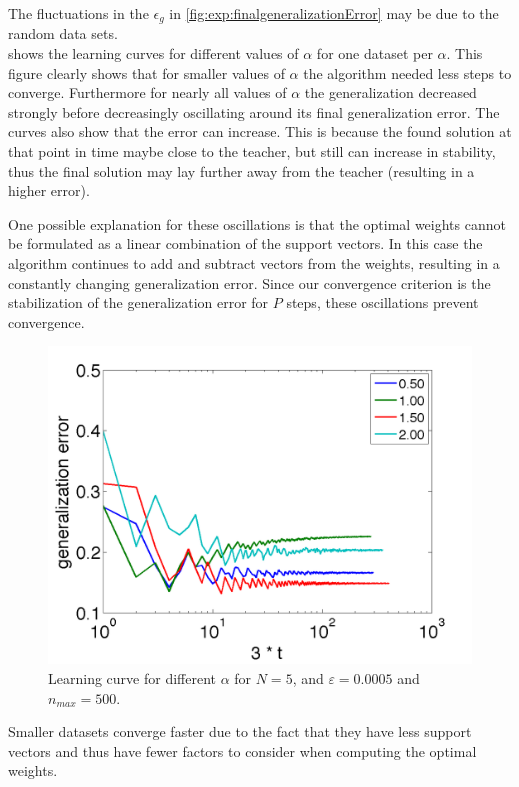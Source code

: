 The fluctuations in the $\epsilon_g$ in \cref{fig:exp:finalgeneralizationError} may be due to the random data sets.\\

 shows the learning curves for different values of $\alpha$ for one dataset per $\alpha$. This figure clearly shows that for smaller values of $\alpha$ the algorithm needed less steps to converge. Furthermore for nearly all values of $\alpha$ the generalization decreased strongly before decreasingly oscillating around its final generalization error. The curves also show that the error can increase. This is because the found solution at that point in time maybe close to the teacher, but still can increase in stability, thus the final solution may lay further away from the teacher (resulting in a higher error). 

One possible explanation for these oscillations is that the optimal weights cannot be formulated as a linear combination of the support vectors. In this case the algorithm continues to add and subtract vectors from the weights, resulting in a constantly changing generalization error. Since our convergence criterion is the stabilization of the generalization error for $P$ steps, these oscillations prevent convergence. 

\begin{figure}
	\centering
	\includegraphics[width=0.9\columnwidth]{./img/N5NMAX500error3}
	\caption{Learning curve for different $\alpha$ for $N = 5$, and $\varepsilon = 0.0005$ and $n_{max} = 500$.}
	\label{fig:exp:learningcurve}
\end{figure}

Smaller datasets converge faster due to the fact that they have less support vectors and thus have fewer factors to consider when computing the optimal weights. 